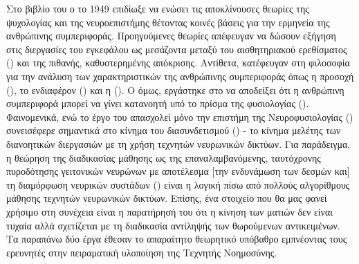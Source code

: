 Στο βιβλίο του \cite{hebb1949organization} ο  το 1949 επιδίωξε να ενώσει τις αποκλίνουσες θεωρίες της ψυχολογίας και της νευροεπιστήμης θέτοντας κοινές βάσεις για την ερμηνεία της ανθρώπινης συμπεριφοράς. Προηγούμενες θεωρίες απέφευγαν να δώσουν εξήγηση στις διεργασίες του εγκεφάλου ως μεσάζοντα μεταξύ του αισθητηριακού ερεθίσματος () και της πιθανής, καθυστερημένης απόκρισης. Αντίθετα, κατέφευγαν στη φιλοσοφία για την ανάλυση των χαρακτηριστικών της ανθρώπινης συμπεριφοράς όπως η προσοχή (), το ενδιαφέρον () και η  (). Ο  όμως, εργάστηκε στο να αποδείξει ότι η ανθρώπινη συμπεριφορά μπορεί να γίνει κατανοητή υπό το πρίσμα της φυσιολογίας (). Φαινομενικά, ενώ το έργο του απασχολεί μόνο την επιστήμη της Νευροφυσιολογίας () συνεισέφερε σημαντικά στο κίνημα του διασυνδετισμού () - το κίνημα μελέτης των διανοητικών διεργασιών με τη χρήση τεχνητών νευρωνικών δικτύων. Για παράδειγμα, η θεώρηση της διαδικασίας μάθησης ως της επαναλαμβανόμενης, ταυτόχρονης πυροδότησης γειτονικών νευρώνων με αποτέλεσμα [την ενδυνάμωση των δεσμών και] τη διαμόρφωση νευρικών συστάδων () είναι η λογική πίσω από πολλούς αλγορίθμους μάθησης τεχνητών νευρωνικών δικτύων. Επίσης, ένα στοιχείο που θα μας φανεί χρήσιμο στη συνέχεια είναι η παρατήρησή του ότι η κίνηση των ματιών δεν είναι τυχαία αλλά σχετίζεται με τη διαδικασία αντίληψής των θωρούμενων αντικειμένων. Τα παραπάνω δύο έργα έθεσαν το απαραίτητο θεωρητικό υπόβαθρο εμπνέοντας τους ερευνητές στην πειραματική υλοποίηση της Τεχνητής Νοημοσύνης.
\par

